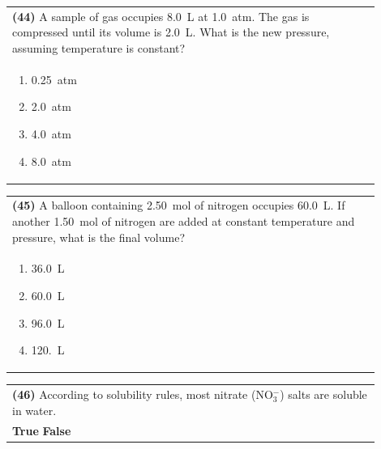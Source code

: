 \documentclass{article}
\begin{document}
\vspace{0.2cm}
\noindent\begin{tabular}{|p{0.9\linewidth}|}
\hline
\textbf{(44)} A sample of gas occupies 8.0~L at 1.0~atm. The gas is compressed until its volume is 2.0~L. What is the new pressure, assuming temperature is constant?\\[0.2cm]
\begin{minipage}[t]{0.85\linewidth}
\begin{enumerate}[label=\alph*.]
\item 0.25~atm
\item 2.0~atm
\item 4.0~atm
\item 8.0~atm
\end{enumerate}
\end{minipage}\\[0.2cm]
\hline
\end{tabular}
\newpage

\vspace{0.2cm}
\noindent\begin{tabular}{|p{0.9\linewidth}|}
\hline
\textbf{(45)} A balloon containing 2.50~mol of nitrogen occupies 60.0~L. If another 1.50~mol of nitrogen are added at constant temperature and pressure, what is the final volume?\\[0.2cm]
\begin{minipage}[t]{0.85\linewidth}
\begin{enumerate}[label=\alph*.]
\item 36.0~L
\item 60.0~L
\item 96.0~L
\item 120.~L
\end{enumerate}
\end{minipage}\\[0.2cm]
\hline
\end{tabular}

\vspace{0.2cm}
\noindent\begin{tabular}{|p{0.9\linewidth}|}
\hline
\textbf{(46)} According to solubility rules, most nitrate (NO$_3^-$) salts are soluble in water.\\[0.2cm]
\textbf{True} \hspace{1cm} \textbf{False}\\[0.2cm]
\hline
\end{tabular}
\end{document}
